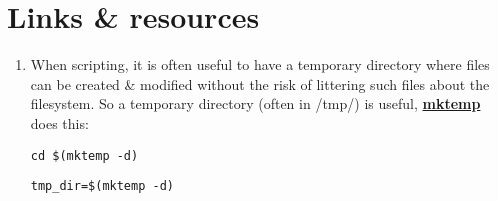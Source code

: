 \documentclass[a4paper]{article}
\begin{document}
\section*{Links \& resources}
\begin{enumerate}

\item When scripting, it is often useful to have a temporary directory where files can be created \& modified without the risk of littering such files about the filesystem. So a temporary directory (often in /tmp/) is useful, \href{https://code-maven.com/create-temporary-directory-on-linux-using-bash}{\textbf{mktemp}} does this:
	\begin{lstlisting}[title=move to the new temporary directory]
	cd $(mktemp -d)
	\end{lstlisting}
	\begin{lstlisting}[title=store the new temporary directory path]
	tmp_dir=$(mktemp -d)
	\end{lstlisting}
\end{enumerate}
\end{document}
